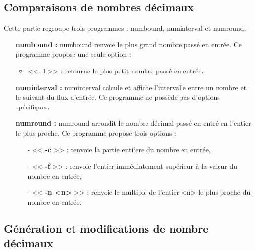 \subsection{Comparaisons de nombres d\'ecimaux}

Cette partie regroupe trois programmes : numbound, numinterval et numround.
\newline
\begin{itemize}
 \item[\textbullet]  \textbf{numbound :} numbound renvoie le plus grand nombre pass\'e en entr\'ee.
Ce programme propose une seule option :
\begin{itemize}
  \item << \textbf{-l} >> : retourne le plus petit nombre pass\'e en entr\'ee.
\newline
\end{itemize}
 \item[\textbullet] \textbf{numinterval :} numinterval calcule et affiche l'intervalle entre un nombre et le suivant du flux d'entr\'ee.
Ce programme ne poss\`ede pas d'options sp\'ecifiques.
\newline{}
 \item[\textbullet] \textbf{numround :} numround arrondit le nombre d\'ecimal pass\'e en entr\'e en l'entier le plus proche.
Ce programme propose trois options :
\begin{itemize}
 \item[-] << \textbf{-c} >> : renvoie la partie enti`ere du nombre en entr\'ee,
 \item[-] << \textbf{-f} >> : renvoie l'entier imm\'ediatement sup\'erieur \`a la valeur du nombre en entr\'ee, 
 \item[-] << \textbf{-n <n>} >> : renvoie le multiple de l'entier <n> le plus proche du nombre en entr\'ee.
\end{itemize}
\end{itemize}

\subsection{G\'en\'eration et modifications de nombre d\'ecimaux}

